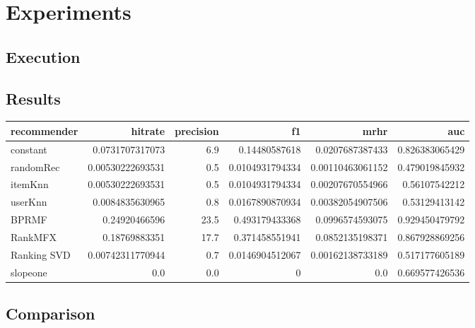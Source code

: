 
\chapter{Experiments}
\label{experiments}


\section{Execution}


\section{Results}
\label{results}
\begin{tabular}{lrrrrr} \toprule
    recommender  & hitrate & precision & f1 & mrhr & auc \\ \midrule
    constant & 0.0731707317073 & 6.9 & 0.14480587618 & 0.0207687387433 & 0.826383065429 \\
    randomRec & 0.00530222693531 & 0.5 & 0.0104931794334 & 0.00110463061152 & 0.479019845932 \\
    itemKnn & 0.00530222693531 & 0.5 & 0.0104931794334 & 0.00207670554966 & 0.56107542212 \\
    userKnn & 0.0084835630965 & 0.8 & 0.0167890870934 & 0.00382054907506 & 0.53129413142 \\
    BPRMF& 0.24920466596 & 23.5 & 0.493179433368 & 0.0996574593075 & 0.929450479792 \\
    RankMFX & 0.18769883351 & 17.7 & 0.371458551941 & 0.0852135198371 & 0.867928869256 \\
    Ranking SVD & 0.00742311770944 & 0.7 & 0.0146904512067 & 0.00162138733189 & 0.517177605189 \\
    slopeone & 0.0 & 0.0 & 0 & 0.0 & 0.669577426536 \\ \bottomrule
\end{tabular}

\section{Comparison}


